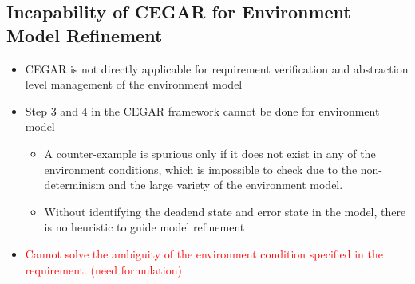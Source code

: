 \documentclass{llncs}
\begin{document}
\subsection{Incapability of CEGAR for Environment Model Refinement}
\begin{itemize}
	\item CEGAR is not directly applicable for requirement verification and abstraction level management of the environment model
	\item Step 3 and 4 in the CEGAR framework cannot be done for environment model  
    \begin{itemize}
    	\item A counter-example is spurious only if it does not exist in any of the environment conditions, which is impossible to check due to the non-determinism and the large variety of the environment model.
        
        \item Without identifying the deadend state and error state in the model, there is no heuristic to guide model refinement
    \end{itemize}
    \item\textcolor{red}{Cannot solve the ambiguity of the environment condition specified in the requirement. (need formulation)}
\end{itemize}
\end{document}
